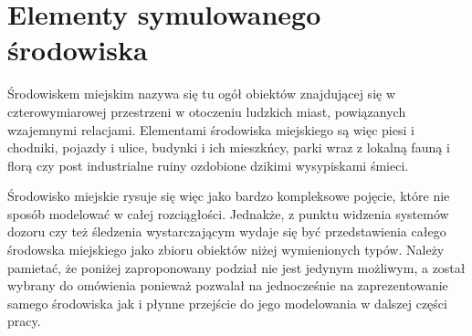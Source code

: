 {\section[Elementy symulowanego środowiska][Elementy symulowanego środowiska]{Elementy symulowanego środowiska}
\par{
Środowiskem miejskim nazywa się tu ogół obiektów znajdującej się w czterowymiarowej przestrzeni w otoczeniu ludzkich miast, powiązanych wzajemnymi relacjami. Elementami środowiska miejskiego są więc piesi i chodniki, pojazdy i ulice, budynki i ich mieszkńcy, parki wraz z lokalną fauną i florą czy post industrialne ruiny ozdobione dzikimi wysypiskami śmieci.
}
\par{
Środowisko miejskie rysuje się więc jako bardzo kompleksowe pojęcie, które nie sposób modelować w całej rozciągłości. Jednakże, z punktu widzenia systemów dozoru czy też śledzenia wystarczającym wydaje się być przedstawienia całego środowska miejskiego jako zbioru obiektów niżej wymienionych typów. Należy pamietać, że poniżej zaproponowany podział nie jest jedynym możliwym, a został wybrany do omówienia ponieważ pozwalał na jednocześnie na zaprezentowanie samego środowiska jak i płynne przejście do jego modelowania w dalszej części pracy.
}
}
